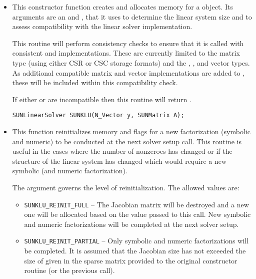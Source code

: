 \begin{itemize}


\item {}

  This constructor function creates and allocates memory for a {\sunlinsolklu}
  object.  Its arguments are an {\nvector} and {\sunmatrix}, that it
  uses to determine the linear system size and to assess compatibility
  with the linear solver implementation. 

  This routine will perform consistency checks to ensure that it is
  called with consistent {\nvector} and {\sunmatrix} implementations.
  These are currently limited to the {\sunmatsparse} matrix type
  (using either CSR or CSC storage formats) and the {\nvecs},
  {\nvecopenmp}, and {\nvecpthreads} vector types.  As additional
  compatible matrix and vector implementations are added to
  {\sundials}, these will be included within this compatibility
  check. 

  If either  or  are incompatible then this routine will
  return .

  \verb|SUNLinearSolver SUNKLU(N_Vector y, SUNMatrix A);|


\item {}

  This function reinitializes memory and flags for a new factorization
  (symbolic and numeric) to be conducted at the next solver setup
  call.  This routine is useful in the cases where the number of
  nonzeroes has changed or if the structure of the linear system has
  changed which would require a new symbolic (and numeric
  factorization). 

  The  argument governs the level of
  reinitialization.  The allowed values are: 
  \begin{itemize}
  \item \texttt{SUNKLU\_REINIT\_FULL} -- The Jacobian matrix will be destroyed
    and a new one will be allocated based on the  value passed
    to this call.  New symbolic and numeric factorizations will be
    completed at the next solver setup. 
  \item \texttt{SUNKLU\_REINIT\_PARTIAL} -- Only symbolic and numeric 
    factorizations will be completed.  It is assumed that the Jacobian 
    size has not exceeded the size of  given in the sparse 
    matrix provided to the original constructor routine (or the
    previous  call). 
  \end{itemize}
  

\end{itemize}
